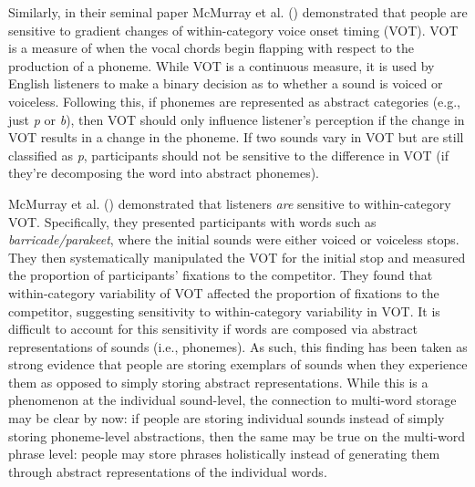 \documentclass[
  12pt,
]{scrartcl}
\begin{document}
Similarly, in their seminal paper McMurray et al.
()
demonstrated that people are sensitive to gradient changes of
within-category voice onset timing (VOT). VOT is a measure of when the
vocal chords begin flapping with respect to the production of a phoneme.
While VOT is a continuous measure, it is used by English listeners to
make a binary decision as to whether a sound is voiced or voiceless.
Following this, if phonemes are represented as abstract categories
(e.g., just \emph{p} or \emph{b}), then VOT should only influence
listener's perception if the change in VOT results in a change in the
phoneme. If two sounds vary in VOT but are still classified as \emph{p},
participants should not be sensitive to the difference in VOT (if
they're decomposing the word into abstract phonemes).

McMurray et al.
()
demonstrated that listeners \emph{are} sensitive to within-category VOT.
Specifically, they presented participants with words such as
\emph{barricade/parakeet}, where the initial sounds were either voiced
or voiceless stops. They then systematically manipulated the VOT for the
initial stop and measured the proportion of participants' fixations to
the competitor. They found that within-category variability of VOT
affected the proportion of fixations to the competitor, suggesting
sensitivity to within-category variability in VOT. It is difficult to
account for this sensitivity if words are composed via abstract
representations of sounds (i.e., phonemes). As such, this finding has
been taken as strong evidence that people are storing exemplars of
sounds when they experience them as opposed to simply storing abstract
representations. While this is a phenomenon at the individual
sound-level, the connection to multi-word storage may be clear by now:
if people are storing individual sounds instead of simply storing
phoneme-level abstractions, then the same may be true on the multi-word
phrase level: people may store phrases holistically instead of
generating them through abstract representations of the individual
words.
\end{document}

